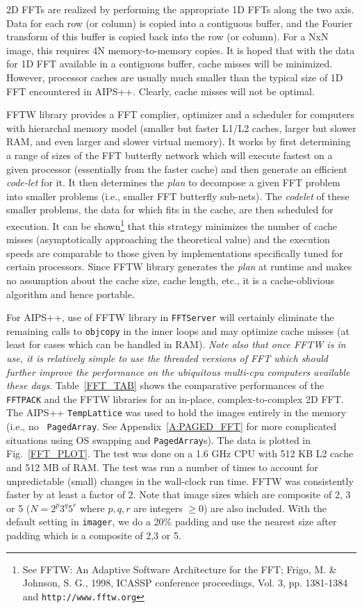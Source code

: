 2D FFTs are realized by performing the appropriate 1D FFTs along the
two axis.  Data for each row (or column) is copied into a contiguous
buffer, and the Fourier transform of this buffer is copied back into
the row (or column).  For a NxN image, this requires 4N
memory-to-memory copies.  It is hoped that with the data for 1D FFT
available in a contiguous buffer, cache misses will be minimized.
However, processor caches are usually much smaller than the typical
size of 1D FFT encountered in AIPS++.  Clearly, cache misses will not
be optimal.

FFTW library provides a FFT complier, optimizer and a scheduler for
computers with hierarchal memory model (smaller but faster L1/L2
caches, larger but slower RAM, and even larger and slower virtual
memory).  It works by first determining a range of sizes of the FFT
butterfly network which will execute fastest on a given processor
(essentially from the faster cache) and then generate an efficient
{\it code-let} for it.  It then determines the {\it plan} to decompose
a given FFT problem into smaller problems (i.e., smaller FFT butterfly
sub-nets).  The {\it codelet} of these smaller problems, the data for
which fits in the cache, are then scheduled for execution.  It can be
shown\footnote{See FFTW: An Adaptive Software Architecture for the
FFT; Frigo, M. \& Johnson, S. G., 1998, ICASSP conference proceedings,
Vol. 3, pp. 1381-1384 and {\tt http://www.fftw.org}} that this
strategy minimizes the number of cache misses (asymptotically
approaching the theoretical value) and the execution speeds are
comparable to those given by implementations specifically tuned for
certain processors.  Since FFTW library generates the {\it plan} at
runtime and makes no assumption about the cache size, cache length,
etc., it is a cache-oblivious algorithm and hence portable.

For AIPS++, use of FFTW library in {\tt FFTServer} will certainly
eliminate the remaining calls to {\tt objcopy} in the inner loops and
may optimize cache misses (at least for cases which can be handled in
RAM).  {\it Note also that once FFTW is in use, it is relatively
simple to use the threaded versions of FFT which should further
improve the performance on the ubiquitous multi-cpu computers
available these days}.  Table~\ref{FFT_TAB} shows the comparative
performances of the {\tt FFTPACK} and the FFTW libraries for an
in-place, complex-to-complex 2D FFT.  The AIPS++ {\tt TempLattice} was
used to hold the images entirely in the memory (i.e., no {\tt
PagedArray}.  See Appendix~\ref{A:PAGED_FFT} for more complicated
situations using OS swapping and {\tt PagedArray}s).  The data is
plotted in Fig.~\ref{FFT_PLOT}.  The test was done on a 1.6 GHz CPU
with 512 KB L2 cache and 512 MB of RAM.  The test was run a number of
times to account for unpredictable (small) changes in the wall-clock
run time.  FFTW was consistently faster by at least a factor of $2$.
Note that image sizes which are composite of 2, 3 or 5 ($N=2^p 3^q
5^r$ where $p,q,r$ are integers $\ge 0$) are also included.  With the
default setting in {\tt imager}, we do a 20\% padding and use the
nearest size after padding which is a composite of 2,3 or 5.

